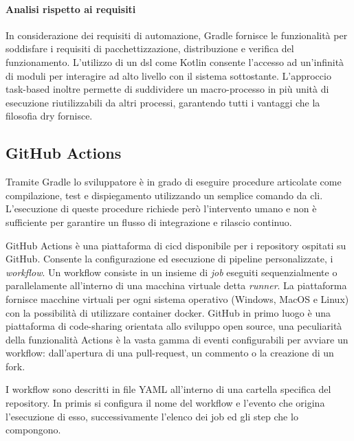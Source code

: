 \paragraph{Analisi rispetto ai requisiti}
In considerazione dei requisiti di automazione, Gradle fornisce le funzionalità per soddisfare i requisiti di pacchettizzazione, distribuzione e verifica del funzionamento. L'utilizzo di un \ac{dsl} come Kotlin consente l'accesso ad un'infinità di moduli per interagire ad alto livello con il sistema sottostante. L'approccio task-based inoltre permette di suddividere un macro-processo in più unità di esecuzione riutilizzabili da altri processi, garantendo tutti i vantaggi che la filosofia \ac{dry} fornisce.

\newpage
\subsection{GitHub Actions}

Tramite Gradle lo sviluppatore è in grado di eseguire procedure articolate come compilazione, test e dispiegamento utilizzando un semplice comando da \ac{cli}. \\ L'esecuzione di queste procedure richiede però l'intervento umano e non è sufficiente per garantire un flusso di integrazione e rilascio continuo. 

GitHub Actions è una piattaforma di \ac{cicd} disponibile per i repository ospitati su GitHub. Consente la configurazione ed esecuzione di pipeline personalizzate, i \textit{workflow}. Un workflow consiste in un insieme di \textit{job} eseguiti sequenzialmente o parallelamente all'interno di una macchina virtuale detta \textit{runner}. La piattaforma fornisce macchine virtuali per ogni sistema operativo (Windows, MacOS e Linux) con la possibilità di utilizzare container docker. GitHub in primo luogo è una piattaforma di code-sharing orientata allo sviluppo open source, una peculiarità della funzionalità Actions è la vasta gamma di eventi configurabili per avviare un workflow: dall'apertura di una pull-request, un commento o la creazione di un fork.

I workflow sono descritti in file YAML all'interno di una cartella specifica del repository. In primis si configura il nome del workflow e l'evento che origina l'esecuzione di esso, successivamente l'elenco dei job ed gli step che lo compongono. 

